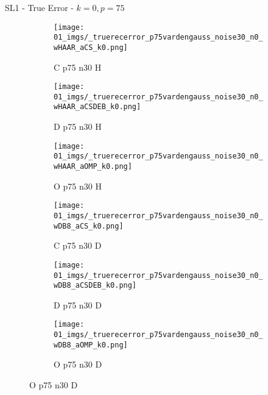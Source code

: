 \begin{frame}{SL1 - True Error - $k=0,p=75$}{}
\begin{figure}
\vspace{5pt}

\begin{subfigure}{0.13\textwidth}
\texttt{[image: 01\_imgs/\_truerecerror\_p75vardengauss\_noise30\_n0\_wHAAR\_aCS\_k0.png]}
\caption*{\tiny C p75 n30 H}
\end{subfigure}
\begin{subfigure}{0.13\textwidth}
\texttt{[image: 01\_imgs/\_truerecerror\_p75vardengauss\_noise30\_n0\_wHAAR\_aCSDEB\_k0.png]}
\caption*{\tiny D p75 n30 H}
\end{subfigure}
\begin{subfigure}{0.13\textwidth}
\texttt{[image: 01\_imgs/\_truerecerror\_p75vardengauss\_noise30\_n0\_wHAAR\_aOMP\_k0.png]}
\caption*{\tiny O p75 n30 H}
\end{subfigure}
\begin{subfigure}{0.13\textwidth}
\texttt{[image: 01\_imgs/\_truerecerror\_p75vardengauss\_noise30\_n0\_wDB8\_aCS\_k0.png]}
\caption*{\tiny C p75 n30 D}
\end{subfigure}
\begin{subfigure}{0.13\textwidth}
\texttt{[image: 01\_imgs/\_truerecerror\_p75vardengauss\_noise30\_n0\_wDB8\_aCSDEB\_k0.png]}
\caption*{\tiny D p75 n30 D}
\end{subfigure}
\begin{subfigure}{0.13\textwidth}
\texttt{[image: 01\_imgs/\_truerecerror\_p75vardengauss\_noise30\_n0\_wDB8\_aOMP\_k0.png]}
\caption*{\tiny O p75 n30 D}
\end{subfigure}
\end{figure}
\end{frame}


